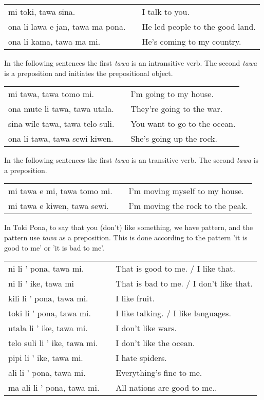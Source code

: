 \begin{supertabular}{p{5,5cm}|ll}
mi toki, tawa sina. && I talk to you. \\
ona li lawa e jan, tawa ma pona. && He led people to the good land. \\
ona li kama, tawa ma mi. && He's coming to my country. \\
\end{supertabular} 

In the following sentences the first \textit{tawa} is an intransitive verb.
The second \textit{tawa} is a preposition and initiates the prepositional object. 

\begin{supertabular}{p{5,5cm}|ll}
mi tawa, tawa tomo mi. && I'm going to my house. \\
ona mute li tawa, tawa utala. && They're going to the war. \\
sina wile tawa, tawa telo suli. && You want to go to the ocean. \\
ona li tawa, tawa sewi kiwen. && She's going up the rock. \\
\end{supertabular} 

In the following sentences the first \textit{tawa} is an transitive verb.
The second \textit{tawa} is a preposition.

\begin{supertabular}{p{5,5cm}|ll}
mi tawa e mi, tawa tomo mi. && I'm moving myself to my house. \\
mi tawa e kiwen, tawa sewi. && I'm moving the rock to the peak. \\
\end{supertabular} 

%
In Toki Pona, to say that you (don't) like something, we have pattern, and the pattern use \textit{tawa} as a preposition. 
This is done according to the pattern 'it is good to me' or 'it is bad to me'. 

\begin{supertabular}{p{5,5cm}|ll}
ni li ' pona, tawa mi. && That is good to me. / I like that. \\
ni li ' ike, tawa mi && That is bad to me. / I don't like that. \\
kili li ' pona, tawa mi. && I like fruit. \\
toki li ' pona, tawa mi. && I like talking. / I like languages. \\
utala li ' ike, tawa mi. && I don't like wars. \\
telo suli li ' ike, tawa mi. && I don't like the ocean. \\
pipi li ' ike, tawa mi. && I hate spiders. \\
ali li ' pona, tawa mi. && Everything's fine to me.  \\
ma ali li ' pona, tawa mi. && All nations are good to me.. \\
\end{supertabular} 
%

